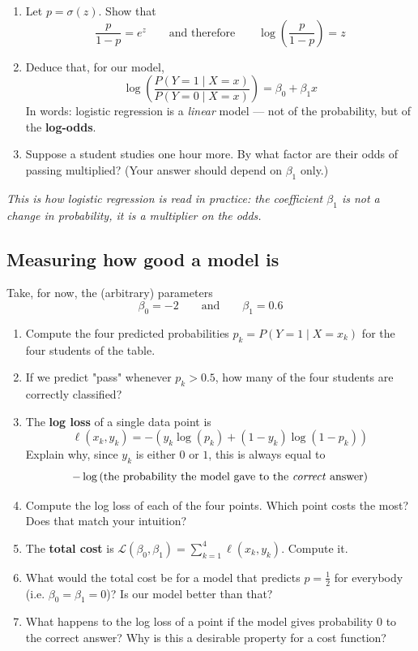 \documentclass[]{article}
\begin{document}
	\begin{enumerate}
		\item Let $p = \sigma(z)$. Show that
		$$\frac{p}{1-p} = e^{z}
		\qquad \text{and therefore} \qquad
		\log\left(\frac{p}{1-p}\right) = z$$
		\item Deduce that, for our model,
		$$\log\left(\frac{P(Y=1 \mid X=x)}{P(Y=0 \mid X=x)}\right) = \beta_0 + \beta_1 x$$
		In words: logistic regression is a \textit{linear} model --- not of the probability, but of the \textbf{log-odds}.
		\item Suppose a student studies one hour more.
		By what factor are their odds of passing multiplied?
		(Your answer should depend on $\beta_1$ only.)
	\end{enumerate}
	\textit{This is how logistic regression is read in practice: the coefficient $\beta_1$ is not a change in probability, it is a multiplier on the odds.}

	\subsection{Measuring how good a model is}
	Take, for now, the (arbitrary) parameters
	$$\beta_0 = -2 \qquad \text{and} \qquad \beta_1 = 0.6$$

	\begin{enumerate}
		\item Compute the four predicted probabilities $p_k = P(Y=1 \mid X = x_k)$ for the four students of the table.
		\item If we predict "pass" whenever $p_k > 0.5$, how many of the four students are correctly classified?
		\item The \textbf{log loss} of a single data point is
		$$\ell(x_k, y_k) = -\left( y_k \log(p_k) + (1-y_k) \log(1-p_k) \right)$$
		Explain why, since $y_k$ is either $0$ or $1$, this is always equal to
		$$-\log\left(\text{the probability the model gave to the \textit{correct} answer}\right)$$
		\item Compute the log loss of each of the four points.
		Which point costs the most? Does that match your intuition?
		\item The \textbf{total cost} is $\mathcal{L}(\beta_0,\beta_1) = \sum_{k=1}^{4} \ell(x_k,y_k)$.
		Compute it.
		\item What would the total cost be for a model that predicts $p = \frac{1}{2}$ for everybody (i.e. $\beta_0 = \beta_1 = 0$)?
		Is our model better than that?
		\item What happens to the log loss of a point if the model gives probability $0$ to the correct answer?
		Why is this a desirable property for a cost function?
	\end{enumerate}
\end{document}
